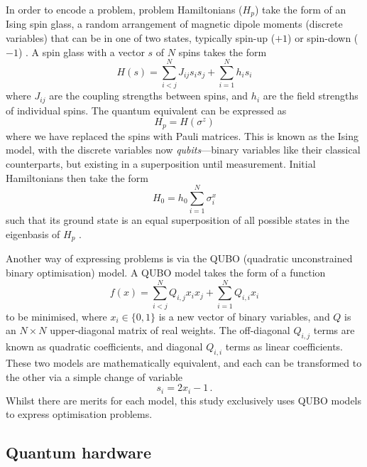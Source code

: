 \documentclass[12pt]{article}
\theoremstyle{definition}
\begin{document}
In order to encode a problem, problem Hamiltonians ($H_p$) take the form of an Ising spin glass, a random arrangement of magnetic dipole moments (discrete variables) that can be in one of two states, typically spin-up ($+1$) or spin-down ($-1$) \cite{lucas_ising_2014}. A spin glass with a vector $s$ of $N$ spins takes the form
\begin{equation}
    H(s) = \sum_{i<j}^{N}J_{ij}s_i s_j + \sum_{i=1}^{N}h_i s_i
    \label{eq:ising}
\end{equation}
where $J_{ij}$ are the coupling strengths between spins, and $h_i$ are the field strengths of individual spins. The quantum equivalent can be expressed as
\begin{equation}
    H_p = H(\sigma^z)
\end{equation}
where we have replaced the spins with Pauli matrices. This is known as the Ising model, with the discrete variables now \emph{qubits}---binary variables like their classical counterparts, but existing in a superposition until measurement. Initial Hamiltonians then take the form
\begin{equation}
    H_0 = h_0\sum_{i=1}^{N}\sigma_i^x
\end{equation}
such that its ground state is an equal superposition of all possible states in the eigenbasis of $H_p$ \cite{boixo_experimental_2013}.

Another way of expressing problems is via the QUBO (quadratic unconstrained binary optimisation) model. A QUBO model takes the form of a function
\begin{equation}
    f(x)=\sum^N_{i<j}Q_{i,j}x_ix_j + \sum^N_{i=1}Q_{i,i}x_i
    \label{eq:qubo}
\end{equation}
to be minimised, where $x_i\in\{0,1\}$ is a new vector of binary variables, and $Q$ is an $N\times N$ upper-diagonal matrix of real weights. The off-diagonal $Q_{i,j}$ terms are known as quadratic coefficients, and diagonal $Q_{i,i}$ terms as linear coefficients. These two models are mathematically equivalent, and each can be transformed to the other via a simple change of variable
\begin{equation}
    s_i = 2x_i - 1 \,.
    \label{eq:qubo-ising}
\end{equation}
Whilst there are merits for each model, this study exclusively uses QUBO models to express optimisation problems.

\subsection{Quantum hardware}
\end{document}
